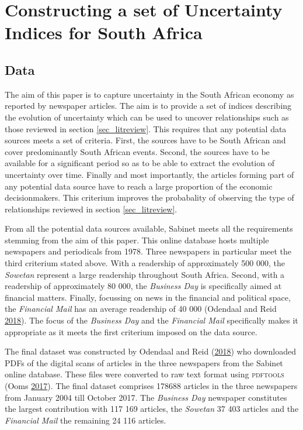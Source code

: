 \documentclass[11pt,preprint, authoryear]{elsarticle}
\numberwithin{equation}{section}
\numberwithin{figure}{section}
\numberwithin{table}{section}
\begin{document}
\section{\texorpdfstring{Constructing a set of Uncertainty Indices for
South Africa
\label{sec_EPU}}{Constructing a set of Uncertainty Indices for South Africa }}\label{constructing-a-set-of-uncertainty-indices-for-south-africa}

\subsection{\texorpdfstring{Data \label{sec_data}}{Data }}\label{data}

The aim of this paper is to capture uncertainty in the South African
economy as reported by newspaper articles. The aim is to provide a set
of indices describing the evolution of uncertainty which can be used to
uncover relationships such as those reviewed in section
\ref{sec_litreview}. This requires that any potential data sources meets
a set of criteria. First, the sources have to be South African and cover
predominantly South African events. Second, the sources have to be
available for a significant period so as to be able to extract the
evolution of uncertainty over time. Finally and most importantly, the
articles forming part of any potential data source have to reach a large
proportion of the economic decisionmakers. This criterium improves the
probabality of observing the type of relationships reviewed in section
\ref{sec_litreview}.

From all the potential data sources available, Sabinet meets all the
requirements stemming from the aim of this paper. This online database
hosts multiple newspapers and periodicals from 1978. Three newspapers in
particular meet the third criterium stated above. With a readership of
approximately 500 000, the \emph{Sowetan} represent a large readership
throughout South Africa. Second, with a readership of approximately 80
000, the \emph{Business Day} is specifically aimed at financial matters.
Finally, focussing on news in the financial and political space, the
\emph{Financial Mail} has an average readership of 40 000 (Odendaal and
Reid \protect\hyperlink{ref-Odendaal2018}{2018}). The focus of the
\emph{Business Day} and the \emph{Financial Mail} specifically makes it
appropriate as it meets the first criterium imposed on the data source.

The final dataset was constructed by Odendaal and Reid
(\protect\hyperlink{ref-Odendaal2018}{2018}) who downloaded PDFs of the
digital scans of articles in the three newspapers from the Sabinet
online database. These files were converted to raw text format using
\textsc{pdftools} (Ooms \protect\hyperlink{ref-Ooms2017}{2017}). The
final dataset comprises 178688 articles in the three newspapers from
January 2004 till October 2017. The \emph{Business Day} newspaper
constitutes the largest contribution with 117 169 articles, the
\emph{Sowetan} 37 403 articles and the \emph{Financial Mail} the
remaining 24 116 articles.
\end{document}
